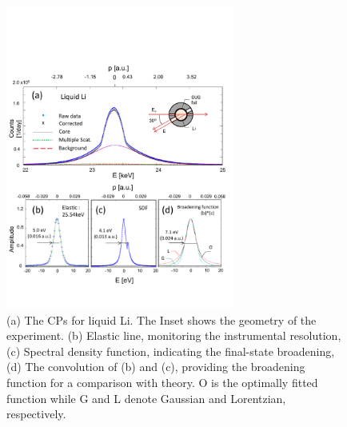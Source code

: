 \documentclass[twocolumn,showpacs,showkeys,fleqn,prl,superscriptaddress]{revtex4}%
\begin{document}
\begin{figure}
\includegraphics[bb= 30 50 500 600, width=7.5cm]{fig1.pdf}
\caption{(a) The CPs for liquid Li. The Inset shows the geometry of the experiment. (b) Elastic line, monitoring the instrumental resolution, 
(c) Spectral density function, indicating the final-state broadening, (d) The convolution of \small{(b)} and (c), providing the broadening function for a comparison with theory. O is the optimally fitted function while G and L denote Gaussian and Lorentzian, respectively.  
} 
\label{Fig.1}
\end{figure}
\end{document}
